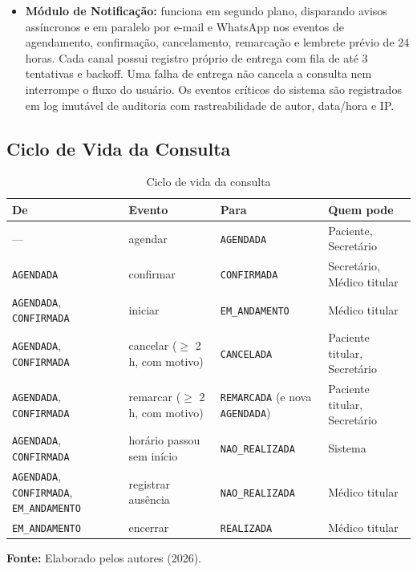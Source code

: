 \documentclass[12pt,a4paper]{article}
\newcommand{\fonte}[1]{%
  \par\vspace{2pt}%
  {\footnotesize\raggedright\textbf{Fonte:} #1\par}%
}
\begin{document}
\begin{itemize}
  recepção através de uma visão centralizada das consultas pendentes de
  confirmação. Permite o contato proativo com os pacientes presenciais
  ou telefônicos e o registro de confirmações (transicionando a consulta
  para \texttt{CONFIRMADA}) ou recusas, gravando autor e data da
  confirmação. A confirmação é \textbf{opcional}, permitindo que o
  médico inicie o atendimento mesmo que a consulta permaneça com status
  \texttt{AGENDADA}.
\item
  \textbf{Módulo de Notificação:} funciona em segundo plano, disparando
  avisos assíncronos e em paralelo por e-mail e WhatsApp nos eventos de
  agendamento, confirmação, cancelamento, remarcação e lembrete prévio
  de 24 horas. Cada canal possui registro próprio de entrega com fila de
  até 3 tentativas e backoff. Uma falha de entrega não cancela a consulta
  nem interrompe o fluxo do usuário. Os eventos críticos do sistema são
  registrados em log imutável de auditoria com rastreabilidade de autor,
  data/hora e IP.
\end{itemize}

\subsection{Ciclo de Vida da Consulta}\label{sec:ciclo}

\begin{table}[H]
\centering
\caption{Ciclo de vida da consulta}
\label{qua:ciclo}
{\footnotesize
\begin{tabularx}{\textwidth}{@{}>{\raggedright\arraybackslash}p{4.6cm}>{\raggedright\arraybackslash}p{3.5cm}>{\raggedright\arraybackslash}p{3.6cm}>{\raggedright\arraybackslash}X@{}}
\toprule
De & Evento & Para & Quem pode \\
\midrule
--- & agendar & \texttt{AGENDADA} & Paciente, Secretário \\
\texttt{AGENDADA} & confirmar & \texttt{CONFIRMADA} & Secretário, Médico titular \\
\texttt{AGENDADA}, \texttt{CONFIRMADA} & iniciar & \texttt{EM\_ANDAMENTO} & Médico titular \\
\texttt{AGENDADA}, \texttt{CONFIRMADA} & cancelar ($\geq$ 2 h, com motivo) & \texttt{CANCELADA} & Paciente titular, Secretário \\
\texttt{AGENDADA}, \texttt{CONFIRMADA} & remarcar ($\geq$ 2 h, com motivo) & \texttt{REMARCADA} (e nova \texttt{AGENDADA}) & Paciente titular, Secretário \\
\texttt{AGENDADA}, \texttt{CONFIRMADA} & horário passou sem início & \texttt{NAO\_REALIZADA} & Sistema \\
\texttt{AGENDADA}, \texttt{CONFIRMADA}, \texttt{EM\_ANDAMENTO} & registrar ausência & \texttt{NAO\_REALIZADA} & Médico titular \\
\texttt{EM\_ANDAMENTO} & encerrar & \texttt{REALIZADA} & Médico titular \\
\bottomrule
\end{tabularx}
}
\fonte{Elaborado pelos autores (2026).}
\end{table}
\end{document}
